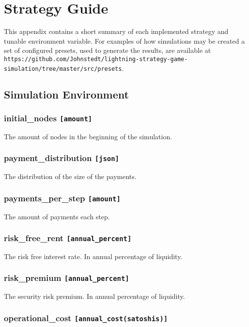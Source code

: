 \chapter{Strategy Guide}
\label{chapter:strategies}

This appendix contains a short summary of each implemented strategy and tunable environment variable. For examples of how simulations may be created a set of configured presets, used to generate the results, are available at \texttt{https://github.com/Johnstedt/lightning-strategy-game-simulation/tree/master/src/presets}.

\section{Simulation Environment}

\subsection*{initial\_nodes \texttt{[amount]}}

The amount of nodes in the beginning of the simulation.

\subsection*{payment\_distribution \texttt{[json]} }

The distribution of the size of the payments. 

\subsection*{payments\_per\_step \texttt{[amount]}}

The amount of payments each step.

\subsection*{risk\_free\_rent \texttt{[annual\_percent]}}

The risk free interest rate. In annual percentage of liquidity. 

\subsection*{risk\_premium \texttt{[annual\_percent]}}

The security risk premium. In annual percentage of liquidity.

\subsection*{operational\_cost \texttt{[annual\_cost(satoshis)]}}

